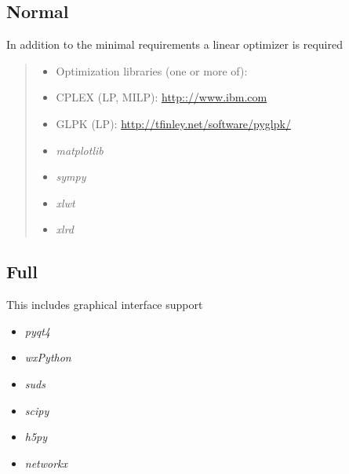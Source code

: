 \documentclass[a4paper,11pt,english]{sphinxmanual}
\begin{document}
\subsection{Normal}
\label{install_doc:normal}
In addition to the minimal requirements a linear optimizer is required
\begin{quote}
\begin{itemize}
\item {} 
Optimization libraries (one or more of):

\end{itemize}
\begin{itemize}
\item {} 
CPLEX (LP, MILP): \url{http:://www.ibm.com}

\item {} 
GLPK  (LP): \url{http://tfinley.net/software/pyglpk/}

\end{itemize}
\begin{itemize}
\item {} 
\emph{matplotlib}

\item {} 
\emph{sympy}

\item {} 
\emph{xlwt}

\item {} 
\emph{xlrd}

\end{itemize}
\end{quote}


\subsection{Full}
\label{install_doc:full}
This includes graphical interface support
\begin{itemize}
\item {} 
\emph{pyqt4}

\item {} 
\emph{wxPython}

\item {} 
\emph{suds}

\item {} 
\emph{scipy}

\item {} 
\emph{h5py}

\item {} 
\emph{networkx}

\end{itemize}
\end{document}
